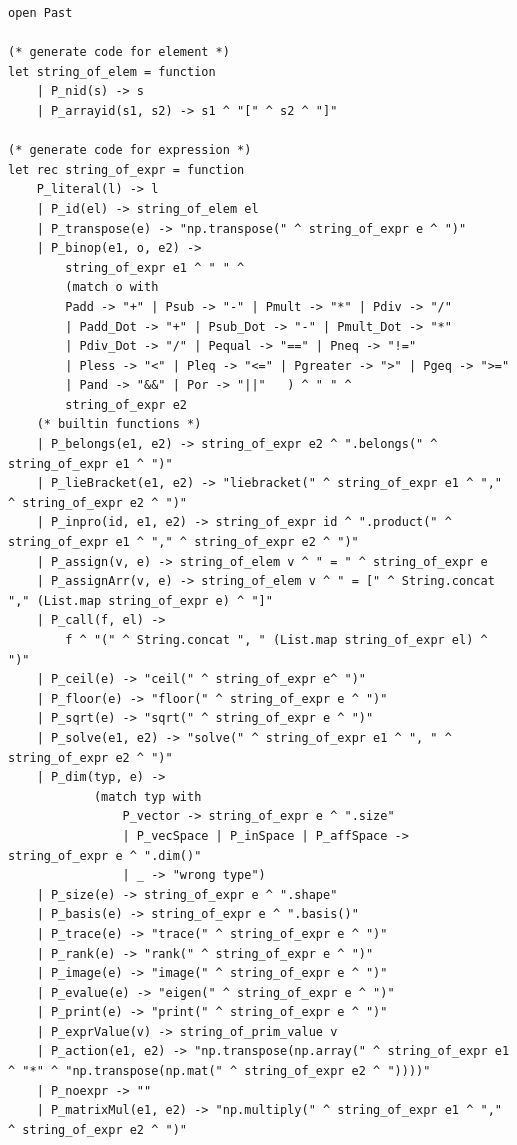 \documentclass[12pt]{article} %
\begin{document}
\begin{lstlisting}[style=appendix, caption=compile.ml]
open Past

(* generate code for element *)
let string_of_elem = function
    | P_nid(s) -> s
    | P_arrayid(s1, s2) -> s1 ^ "[" ^ s2 ^ "]"

(* generate code for expression *)
let rec string_of_expr = function 
    P_literal(l) -> l
    | P_id(el) -> string_of_elem el
    | P_transpose(e) -> "np.transpose(" ^ string_of_expr e ^ ")"
    | P_binop(e1, o, e2) ->
        string_of_expr e1 ^ " " ^
        (match o with
        Padd -> "+" | Psub -> "-" | Pmult -> "*" | Pdiv -> "/"
        | Padd_Dot -> "+" | Psub_Dot -> "-" | Pmult_Dot -> "*"    
        | Pdiv_Dot -> "/" | Pequal -> "==" | Pneq -> "!="
        | Pless -> "<" | Pleq -> "<=" | Pgreater -> ">" | Pgeq -> ">="
        | Pand -> "&&" | Por -> "||"   ) ^ " " ^
        string_of_expr e2  
    (* builtin functions *) 
    | P_belongs(e1, e2) -> string_of_expr e2 ^ ".belongs(" ^ string_of_expr e1 ^ ")"
    | P_lieBracket(e1, e2) -> "liebracket(" ^ string_of_expr e1 ^ "," ^ string_of_expr e2 ^ ")"
    | P_inpro(id, e1, e2) -> string_of_expr id ^ ".product(" ^ string_of_expr e1 ^ "," ^ string_of_expr e2 ^ ")" 
    | P_assign(v, e) -> string_of_elem v ^ " = " ^ string_of_expr e
    | P_assignArr(v, e) -> string_of_elem v ^ " = [" ^ String.concat "," (List.map string_of_expr e) ^ "]"
    | P_call(f, el) ->
        f ^ "(" ^ String.concat ", " (List.map string_of_expr el) ^ ")"
    | P_ceil(e) -> "ceil(" ^ string_of_expr e^ ")"
    | P_floor(e) -> "floor(" ^ string_of_expr e ^ ")"
    | P_sqrt(e) -> "sqrt(" ^ string_of_expr e ^ ")"
    | P_solve(e1, e2) -> "solve(" ^ string_of_expr e1 ^ ", " ^ string_of_expr e2 ^ ")"
    | P_dim(typ, e) -> 
            (match typ with
                P_vector -> string_of_expr e ^ ".size"
                | P_vecSpace | P_inSpace | P_affSpace -> string_of_expr e ^ ".dim()"
                | _ -> "wrong type")
    | P_size(e) -> string_of_expr e ^ ".shape"
    | P_basis(e) -> string_of_expr e ^ ".basis()"
    | P_trace(e) -> "trace(" ^ string_of_expr e ^ ")"
    | P_rank(e) -> "rank(" ^ string_of_expr e ^ ")"
    | P_image(e) -> "image(" ^ string_of_expr e ^ ")"
    | P_evalue(e) -> "eigen(" ^ string_of_expr e ^ ")"
    | P_print(e) -> "print(" ^ string_of_expr e ^ ")"
    | P_exprValue(v) -> string_of_prim_value v
    | P_action(e1, e2) -> "np.transpose(np.array(" ^ string_of_expr e1 ^ "*" ^ "np.transpose(np.mat(" ^ string_of_expr e2 ^ "))))"
    | P_noexpr -> ""
    | P_matrixMul(e1, e2) -> "np.multiply(" ^ string_of_expr e1 ^ "," ^ string_of_expr e2 ^ ")"

\end{lstlisting}
\end{document}
